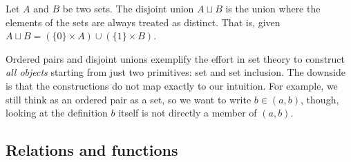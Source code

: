 \documentclass{bareminimum}
\begin{document}
\begin{defn}
	Let $A$ and $B$ be two sets. The disjoint union $A \sqcup B$ is the union where the elements of the sets are always treated as distinct. That is, given $A \sqcup B = (\{0\} \times A ) \cup ( \{1\} \times B )$.
\end{defn}

\begin{remark}
	Ordered pairs and disjoint unions exemplify the effort in set theory to construct \emph{all objects} starting from just two primitives: set and set inclusion. The downside is that the constructions do not map exactly to our intuition. For example, we still think as an ordered pair as a set, so we want to write $b \in (a, b)$, though, looking at the definition $b$ itself is not directly a member of $(a, b)$.
\end{remark}

\subsection{Relations and functions}
\end{document}
